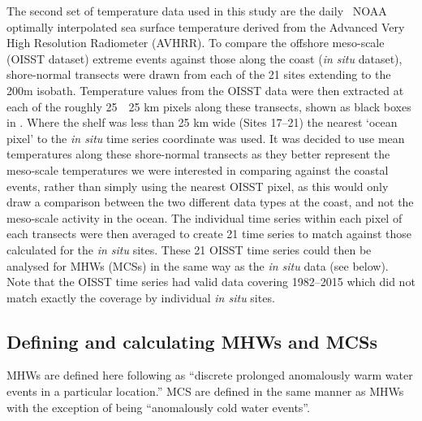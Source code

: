 \documentclass[a4paper,10pt,review]{elsarticle}
\begin{document}
The second set of temperature data used in this study are the daily \degree~NOAA optimally interpolated sea surface temperature \citep[OISST;][]{Reynolds2007} derived from the Advanced Very High Resolution Radiometer (AVHRR). To compare the offshore meso-scale (OISST dataset) extreme events against those along the coast (\emph{in situ} dataset), shore-normal transects were drawn from each of the 21 sites extending to the 200m isobath. Temperature values from the OISST data were then extracted at each of the roughly 25~\texttimes~25 km pixels along these transects, shown as black boxes in . Where the shelf was less than 25 km wide (Sites 17--21) the nearest `ocean pixel' to the \emph{in situ} time series coordinate was used. It was decided to use mean temperatures along these shore-normal transects as they better represent the meso-scale temperatures we were interested in comparing against the coastal events, rather than simply using the nearest OISST pixel, as this would only draw a comparison between the two different data types at the coast, and not the meso-scale activity in the ocean. The individual time series within each pixel of each transects were then averaged to create 21 time series to match against those calculated for the \emph{in situ} sites. These 21 OISST time series could then be analysed for MHWs (MCSs) in the same way as the \emph{in situ} data (see below). Note that the OISST time series had valid data covering 1982--2015 which did not match exactly the coverage by individual \emph{in situ} sites.

\subsection{Defining and calculating MHWs and MCSs}
MHWs are defined here following \citet{Hobday2016} as ``discrete prolonged anomalously warm water events in a particular location.'' MCS are defined in the same manner as MHWs with the exception of being ``anomalously cold water events''.
\end{document}
